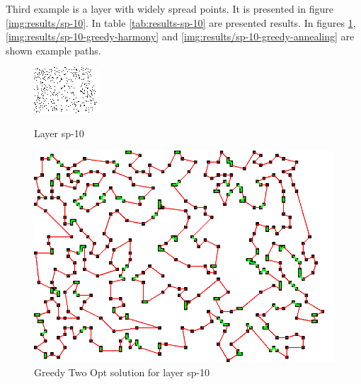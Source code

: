 \documentclass[titlepage]{article}
\newcommand{\multifigcaption}{\captionsetup{justification=justified}}
\begin{document}
Third example is  a layer with widely spread points. It is presented in figure \ref{img:results/sp-10}. In table \ref{tab:results-sp-10} are presented results. In figures \ref{img:results/sp-10-greedy-two-opt}, \ref{img:results/sp-10-greedy-harmony} and \ref{img:results/sp-10-greedy-annealing} are shown example paths.

\begin{figure}[H]
	\begin{center}
		\begin{minipage}{.45\linewidth}
			\includegraphics[width=\textwidth]{img/results/sp-10.png}
			\multifigcaption
			\caption{Layer sp-10 \newline}
			\label{img:results/sp-10}
		\end{minipage}
		\hspace{.05\linewidth}
		\begin{minipage}{.45\linewidth}
			\includegraphics[width=\textwidth]{img/results/sp-10-greedy-two-opt.png}
			\multifigcaption
			\caption{Greedy Two Opt solution for layer sp-10 }
			\label{img:results/sp-10-greedy-two-opt}
		\end{minipage}	
		
	\end{center}
\end{figure}
\end{document}
